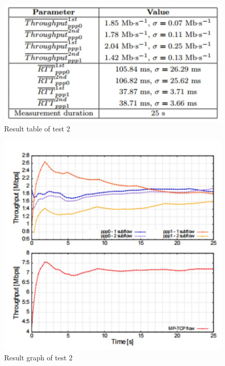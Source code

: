 \documentclass[11pt,twocolumn]{article}
\begin{document}
\begin{figure}[ht]
\begin{center}
\includegraphics[scale=0.6]{table_2}
\caption{Result table of test 2}
\end{center}
\end{figure}
\begin{figure}[ht]
\begin{center}
\includegraphics[scale=0.5]{graph_2}
\caption{Result graph of test 2}
\end{center}
\end{figure}
\end{document}
